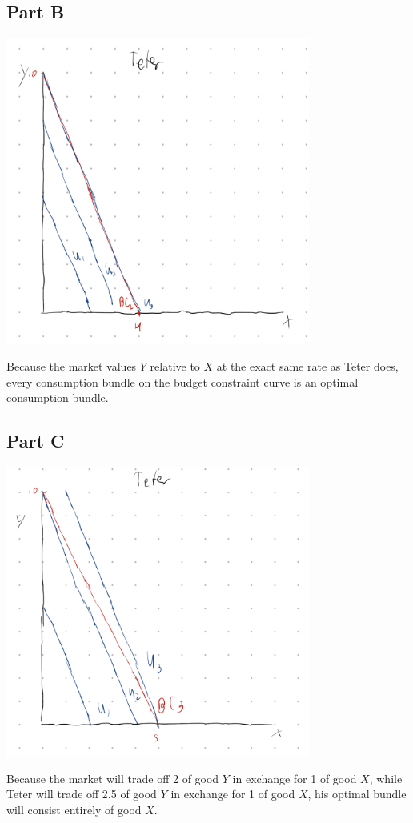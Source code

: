 \documentclass[8pt]{extarticle}
\begin{document}
{\subsection*{Part B}
\begin{center}
	\includegraphics[width=10cm]{HW4Q7B}
\end{center}
Because the market values $Y$ relative to $X$ at the exact same rate as Teter does, every consumption bundle on the budget constraint curve is an optimal consumption bundle.
\subsection*{Part C}
\begin{center}
\includegraphics[width=10cm]{HW4Q7C}
\end{center}
Because the market will trade off 2 of good $Y$ in exchange for 1 of good $X$, while Teter will trade off 2.5 of good $Y$ in exchange for 1 of good $X$, his optimal bundle will consist entirely of good $X$.
}
\end{document}

